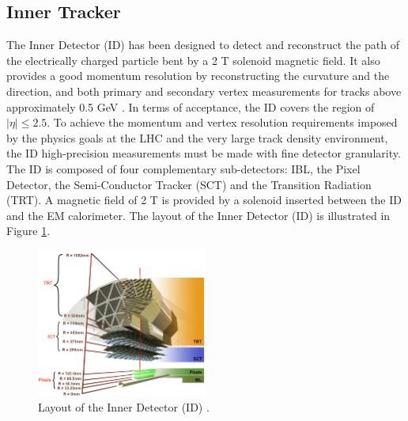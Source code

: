 \subsection{Inner Tracker}
\label{chap2:ATLAS:ITk}
The Inner Detector (ID) has been designed to detect and reconstruct the path of the electrically charged particle bent by a 2 T solenoid magnetic field. It also provides a good momentum resolution by reconstructing the curvature and the direction, and both primary and secondary vertex measurements for tracks above approximately 0.5 GeV \cite{ID_TRD, TrkVertexing}. In terms of acceptance, the ID covers the region of $|\eta|\leqslant2.5$. To achieve the momentum and vertex resolution requirements imposed by the physics goals at the LHC and the very large track density environment, the ID high-precision measurements must be made with fine detector granularity. The ID is composed of four complementary sub-detectors: IBL, the Pixel Detector, the Semi-Conductor Tracker (SCT) and the Transition Radiation (TRT). A magnetic field of 2 T is provided by a solenoid inserted between the ID and the EM calorimeter. The layout of the Inner Detector (ID) is illustrated in Figure \ref{fig:chap2:ATLAS:ITK:ID}.
\begin{figure}[htbp]
    \centering
    \includegraphics[width=0.5\textwidth]{Ch2/Img/ID_withIBL.png}
    \caption{Layout of the Inner Detector (ID) \cite{ID_withIBL}.}
    \label{fig:chap2:ATLAS:ITK:ID}
\end{figure}

